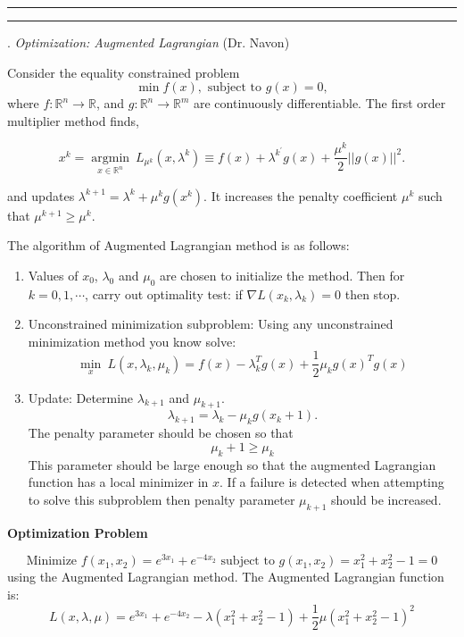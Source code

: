 \documentclass [11point]{article}
\begin{document}
\medskip
\hrule

\pagebreak
\hrule 
{}. \textit{Optimization: Augmented Lagrangian} (Dr. Navon)
\bigskip

Consider the equality constrained problem $$\min f(x), \text{ subject to } g(x) = 0,$$ where $f:\mathbb{R}^n \rightarrow \mathbb{R}$, and $g:\mathbb{R}^n \rightarrow \mathbb{R}^m$ are continuously differentiable. The first order multiplier method finds, 

$$x^k = \underset{x \in \mathbb{R}^n}{\operatorname{argmin}} ~ L_{\mu^k}(x,\lambda^k) \equiv f(x) + \lambda^{k^{\prime}} g(x) + \frac{\mu^{k}}{2} ||g(x)||^2.$$

and updates $\lambda^{k+1} = \lambda^k + \mu^k g(x^k)$. It increases the penalty coefficient $\mu^k$ such that $\mu^{k+1} \ge \mu^k$.

The algorithm of Augmented Lagrangian method is as follows:

\begin{enumerate}
\item Values of $x_0$, $\lambda_0$ and $\mu_0$ are chosen to initialize the method. Then for $k = 0,1,\cdots$, carry out optimality test: if $\nabla L(x_k , \lambda_k ) = 0$ then stop.
\item Unconstrained minimization subproblem: Using any unconstrained minimization method you know solve:
$$\underset{x}{\operatorname{min}} ~ L( x, \lambda_k , \mu_k ) = f(x) - \lambda_k^{T} g(x) + \frac{1}{2} \mu_k g(x)^T g (x)$$
\item Update: Determine $\lambda_{k+1}$ and $\mu_{k+1}$.
$$\lambda_{k+1} = \lambda_k - \mu_k g(x_k +1).$$
The penalty parameter should be chosen so that
$$\mu_k +1 \geq \mu_k$$
This parameter should be large enough so that the augmented Lagrangian function has a local minimizer in $x$. If a failure is detected when attempting to solve this subproblem then penalty parameter $\mu_{k+1}$ should be increased.
\end{enumerate}
\medskip

\textbf{Optimization Problem}

$$\text{Minimize }f(x_1, x_2) = e^{3x_1} + e^{-4 x_2} \text{ subject to } g(x_1, x_2 ) = x_1^2 + x_2^2 - 1 = 0$$ using the Augmented Lagrangian method. The Augmented Lagrangian function is:
$$L(x,\lambda,\mu) = e^{3 x_1} + e^{-4 x_2} - \lambda( x_1^2 + x_2^2 - 1) + \frac{1}{2} \mu(x
_1^2 + x_2^2 - 1)^2$$
\end{document}
